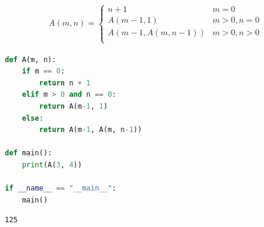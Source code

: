 \vspace{0.5cm}


\begin{align}\nonumber
	A(m, n) =
	\begin{cases}
		n + 1             & m = 0        \\
		A(m-1, 1)         & m > 0, n = 0 \\
		A(m-1, A(m, n-1)) & m > 0, n > 0 \\
	\end{cases}
\end{align}

\begin{lstlisting}[language=Python]
def A(m, n):
	if m == 0:
		return n + 1
	elif m > 0 and n == 0:
		return A(m-1, 1)
	else:
		return A(m-1, A(m, n-1))

def main():
	print(A(3, 4))

if __name__ == "__main__":
	main()
\end{lstlisting}

\begin{tcolorbox}
	\begin{verbatim}
125
\end{verbatim}
\end{tcolorbox}

